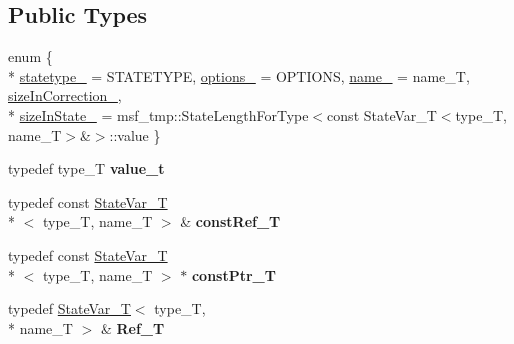 \subsection*{Public Types}
\begin{DoxyCompactItemize}
\item 
enum \{ \\*
\hyperlink{structmsf__core_1_1StateVar__T_a4c4dbb9fb688dffcb86c1a2f5ea7ac3ea95f78b7f121c76d8bcb6ed1be9405e9a}{statetype\-\_\-} =  S\-T\-A\-T\-E\-T\-Y\-P\-E, 
\hyperlink{structmsf__core_1_1StateVar__T_a4c4dbb9fb688dffcb86c1a2f5ea7ac3eae9d831197f62b0f4f15b39ba8d0624e8}{options\-\_\-} =  O\-P\-T\-I\-O\-N\-S, 
\hyperlink{structmsf__core_1_1StateVar__T_a4c4dbb9fb688dffcb86c1a2f5ea7ac3ea312cc9b9c04d8a6af83fccf981ef2e99}{name\-\_\-} =  name\-\_\-\-T, 
\hyperlink{structmsf__core_1_1StateVar__T_a4c4dbb9fb688dffcb86c1a2f5ea7ac3eaafba5fac8b93bd4155c03a70a6d6c9b4}{size\-In\-Correction\-\_\-}, 
\\*
\hyperlink{structmsf__core_1_1StateVar__T_a4c4dbb9fb688dffcb86c1a2f5ea7ac3eaa823d4aa1a204b1d47fa05e98dce06b9}{size\-In\-State\-\_\-} =  msf\-\_\-tmp\-:\-:State\-Length\-For\-Type$<$const State\-Var\-\_\-\-T$<$type\-\_\-\-T, name\-\_\-\-T$>$\&$>$\-:\-:value
 \}
\item 
\hypertarget{structmsf__core_1_1StateVar__T_a4b17a26648ef87fe426df62f973e1b16}{typedef type\-\_\-\-T {\bfseries value\-\_\-t}}\label{structmsf__core_1_1StateVar__T_a4b17a26648ef87fe426df62f973e1b16}

\item 
\hypertarget{structmsf__core_1_1StateVar__T_aebeaee6c5d4290fae59c3d19bf98db38}{typedef const \hyperlink{structmsf__core_1_1StateVar__T}{State\-Var\-\_\-\-T}\\*
$<$ type\-\_\-\-T, name\-\_\-\-T $>$ \& {\bfseries const\-Ref\-\_\-\-T}}\label{structmsf__core_1_1StateVar__T_aebeaee6c5d4290fae59c3d19bf98db38}

\item 
\hypertarget{structmsf__core_1_1StateVar__T_a0130c540891e011606bcd90e9bec6142}{typedef const \hyperlink{structmsf__core_1_1StateVar__T}{State\-Var\-\_\-\-T}\\*
$<$ type\-\_\-\-T, name\-\_\-\-T $>$ $\ast$ {\bfseries const\-Ptr\-\_\-\-T}}\label{structmsf__core_1_1StateVar__T_a0130c540891e011606bcd90e9bec6142}

\item 
\hypertarget{structmsf__core_1_1StateVar__T_a96f0d72b7d31d6a33954400f53f4570d}{typedef \hyperlink{structmsf__core_1_1StateVar__T}{State\-Var\-\_\-\-T}$<$ type\-\_\-\-T, \\*
name\-\_\-\-T $>$ \& {\bfseries Ref\-\_\-\-T}}\label{structmsf__core_1_1StateVar__T_a96f0d72b7d31d6a33954400f53f4570d}


\end{DoxyCompactItemize}
